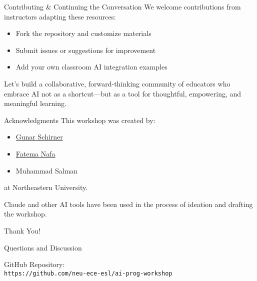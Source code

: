 \documentclass[xcolor={dvipsnames}, aspectratio=169]{beamer}
\begin{document}
\begin{frame}{Contributing \& Continuing the Conversation}
  We welcome contributions from instructors adapting these resources:
  \begin{itemize}
    \item Fork the repository and customize materials
    \item Submit issues or suggestions for improvement
    \item Add your own classroom AI integration examples
  \end{itemize}
  
  Let's build a collaborative, forward-thinking community of educators who embrace AI not as a shortcut—but as a tool for thoughtful, empowering, and meaningful learning.
\end{frame}

\begin{frame}{Acknowledgments}
  This workshop was created by:
  \begin{itemize}
    \item \href{https://coe.northeastern.edu/people/schirner-gunar/}{Gunar Schirner}
    \item \href{https://coe.northeastern.edu/people/nafa-fatema/}{Fatema Nafa}
    \item Muhammad Salman
  \end{itemize}
  
  at Northeastern University.
  
  \vspace{1em}
  
  Claude and other AI tools have been used in the process of ideation and drafting the workshop.
\end{frame}

\begin{frame}{Thank You!}
  \begin{center}
    \Large{Questions and Discussion}
    
    \vspace{2em}
    
    GitHub Repository:\\
    \texttt{https://github.com/neu-ece-esl/ai-prog-workshop}
  \end{center}
\end{frame}
\end{document}
